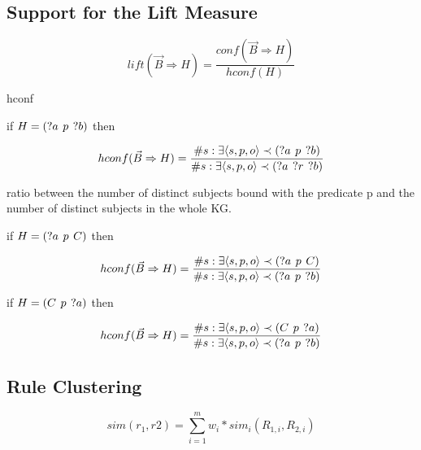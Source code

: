 \subsection{Support for the Lift Measure}

$$lift(\vec{B} \Rightarrow H) = \frac{conf(\vec{B} \Rightarrow H)}{hconf(H)}$$

hconf

if $H = (?a\hspace{0.4em}p\hspace{0.4em}?b)$ then

$$hconf(\vec{B} \Rightarrow H) = \frac{\# s: \exists \langle s,p,o\rangle \prec (?a\hspace{0.4em}p\hspace{0.4em}?b) }{\# s: \exists \langle s,p,o\rangle \prec (?a\hspace{0.4em}?r\hspace{0.4em}?b) }$$

ratio between the number of distinct subjects bound with the predicate p and the number of distinct subjects in the whole KG.

if $H = (?a\hspace{0.4em}p\hspace{0.4em}C)$ then

$$hconf(\vec{B} \Rightarrow H) = \frac{\# s: \exists \langle s,p,o\rangle \prec (?a\hspace{0.4em}p\hspace{0.4em}C) }{\# s: \exists \langle s,p,o\rangle \prec (?a\hspace{0.4em}p\hspace{0.4em}?b) }$$

if $H = (C\hspace{0.4em}p\hspace{0.4em}?a)$ then

$$hconf(\vec{B} \Rightarrow H) = \frac{\# s: \exists \langle s,p,o\rangle \prec (C\hspace{0.4em}p\hspace{0.4em}?a) }{\# s: \exists \langle s,p,o\rangle \prec (?a\hspace{0.4em}p\hspace{0.4em}?b) }$$

\subsection{Rule Clustering}

$$sim(r_{1}, r{2}) = \sum_{i = 1}^m w_{i} * sim_{i}(R_{1,i}, R_{2,i})$$

